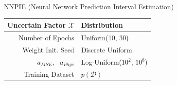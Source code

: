 \documentclass[aspectratio=1610]{beamer}
\begin{document}
\begin{frame}{NNPIE (Neural Network Prediction Interval Estimation)}
\centering
{}



\vfill

\begin{tabular}{rl}
    \textbf{Uncertain Factor} $\mathcal{X}$ & \textbf{Distribution} \\
    \hline
    Number of Epochs & Uniform(10, 30) \\
    \pause
    Weight Init. Seed & Discrete Uniform \\
    \pause
    $a_{MSE}$, \, $a_{Phys}$ & Log-Uniform($10^2$, $10^8$) \\
    \pause
    Training Dataset & $p(\mathcal{D})$
\end{tabular}
\end{frame}
\end{document}

